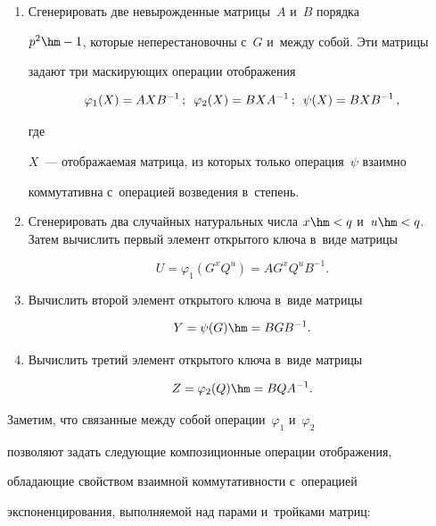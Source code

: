    \begin{enumerate}[1.]


   \item Сгенерировать две невырожденные мат\-ри\-цы~$A$ и~$B$ порядка 


$p^2\hm-1$, которые неперестановочны с~$G$ и~между собой. Эти мат\-ри\-цы 


задают три мас\-ки\-ру\-ющих операции отображения 


$$


\varphi_1(X)=AXB^{-1}\,;\enskip \varphi_2(X)= BXA^{-1}\,; \enskip


\psi(X)= BXB^{-1}\,,


$$


 где 


$X$~--- отображаемая матрица, из которых только операция~$\psi$ взаимно 


коммутативна с~операцией возведения в~степень.


   \item  Сгенерировать два случайных натуральных числа $x\hm <q$ и~$u\hm 


< q$. Затем вычислить первый элемент открытого ключа в~виде мат\-ри\-цы 


$$


U = \varphi_1\left(G^xQ^u\right)=  AG^x Q^u B^{-1}.


$$ 


   \item  Вычислить второй элемент открытого ключа в~виде мат\-ри\-цы 


$$


Y= \psi (G)\hm= BGB^{-1}.


$$


   \item Вычислить третий элемент открытого ключа в~виде мат\-ри\-цы 


$$


Z=\varphi_2(Q)\hm= BQA^{-1}.


$$


   \end{enumerate}


   


   Заметим, что связанные между собой операции~$\varphi_1$ и~$\varphi_2$ 


позволяют задать следующие композиционные операции отображения, 


обладающие свойством взаимной коммутативности с~операцией 


экспоненцирования, выполняемой над парами и~тройками матриц:


